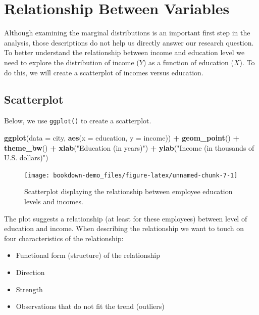 \documentclass[]{book}
\newenvironment{Shaded}{\begin{snugshade}}{\end{snugshade}}
\newcommand{\DataTypeTok}[1]{\textcolor[rgb]{0.13,0.29,0.53}{#1}}
\newcommand{\KeywordTok}[1]{\textcolor[rgb]{0.13,0.29,0.53}{\textbf{#1}}}
\newcommand{\NormalTok}[1]{#1}
\newcommand{\OperatorTok}[1]{\textcolor[rgb]{0.81,0.36,0.00}{\textbf{#1}}}
\newcommand{\StringTok}[1]{\textcolor[rgb]{0.31,0.60,0.02}{#1}}
\providecommand{\tightlist}{%
  \setlength{\itemsep}{0pt}\setlength{\parskip}{0pt}}
\theoremstyle{definition}
\theoremstyle{definition}
\theoremstyle{definition}
\theoremstyle{remark}
\begin{document}
\hypertarget{relationship-between-variables}{%
\section{Relationship Between
Variables}\label{relationship-between-variables}}

Although examining the marginal distributions is an important first step
in the analysis, those descriptions do not help us directly answer our
research question. To better understand the relationship between income
and education level we need to explore the distribution of income
(\(Y\)) as a function of education (\(X\)). To do this, we will create a
scatterplot of incomes versus education.

\hypertarget{scatterplot}{%
\subsection{Scatterplot}\label{scatterplot}}

Below, we use \texttt{ggplot()} to create a scatterplot.

\begin{Shaded}
\begin{Highlighting}[]
\KeywordTok{ggplot}\NormalTok{(}\DataTypeTok{data =}\NormalTok{ city, }\KeywordTok{aes}\NormalTok{(}\DataTypeTok{x =}\NormalTok{ education, }\DataTypeTok{y =}\NormalTok{ income)) }\OperatorTok{+}
\StringTok{  }\KeywordTok{geom_point}\NormalTok{() }\OperatorTok{+}
\StringTok{  }\KeywordTok{theme_bw}\NormalTok{() }\OperatorTok{+}
\StringTok{  }\KeywordTok{xlab}\NormalTok{(}\StringTok{"Education (in years)"}\NormalTok{) }\OperatorTok{+}
\StringTok{  }\KeywordTok{ylab}\NormalTok{(}\StringTok{"Income (in thousands of U.S. dollars)"}\NormalTok{)}
\end{Highlighting}
\end{Shaded}

\begin{figure}
\texttt{[image: bookdown-demo\_files/figure-latex/unnamed-chunk-7-1]} \caption{Scatterplot displaying the relationship between employee education levels and incomes.}\label{fig:unnamed-chunk-7}
\end{figure}

The plot suggests a relationship (at least for these employees) between
level of education and income. When describing the relationship we want
to touch on four characteristics of the relationship:

\begin{itemize}
\tightlist
\item
  Functional form (structure) of the relationship
\item
  Direction
\item
  Strength
\item
  Observations that do not fit the trend (outliers)
\end{itemize}
\end{document}

